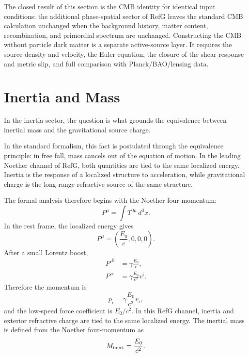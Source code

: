 \documentclass[12pt]{article}
\begin{document}
The closed result of this section is the CMB identity for identical input conditions: the additional phase-spatial sector of RefG leaves the standard CMB calculation unchanged when the background history, matter content, recombination, and primordial spectrum are unchanged. Constructing the CMB without particle dark matter is a separate active-source layer. It requires the source density and velocity, the Euler equation, the closure of the shear response and metric slip, and full comparison with Planck/BAO/lensing data.

\section{Inertia and Mass}

In the inertia sector, the question is what grounds the equivalence between inertial mass and the gravitational source charge.

In the standard formalism, this fact is postulated through the equivalence principle: in free fall, mass cancels out of the equation of motion. In the leading Noether channel of RefG, both quantities are tied to the same localized energy. Inertia is the response of a localized structure to acceleration, while gravitational charge is the long-range refractive source of the same structure.

The formal analysis therefore begins with the Noether four-momentum:
\begin{equation}
P^\mu=\int T^{0\mu}\,d^3x .
\end{equation}
In the rest frame, the localized energy gives
\begin{equation}
P^\mu=\left(\frac{E_0}{c},0,0,0\right).
\end{equation}
After a small Lorentz boost,
\begin{align}
P'^{0} &= \gamma\frac{E_0}{c}, \\
P'^{i} &= \gamma\frac{E_0}{c^2}v^i .
\end{align}
Therefore the momentum is
\begin{equation}
p_i=\gamma\frac{E_0}{c^2}v_i,
\end{equation}
and the low-speed force coefficient is $E_0/c^2$. In this RefG channel, inertia and exterior refractive charge are tied to the same localized energy. The inertial mass is defined from the Noether four-momentum as
\begin{equation}
M_{\rm inert}=\frac{E_0}{c^2}.
\end{equation}
\end{document}
